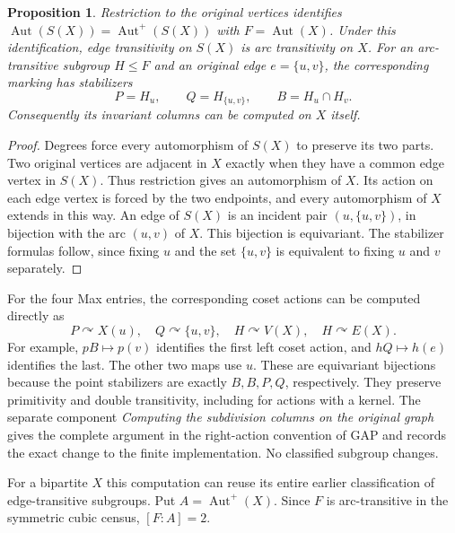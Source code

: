 \documentclass[11pt]{article}
\newtheorem{proposition}[theorem]{Proposition}
\theoremstyle{definition}\newtheorem{definition}[theorem]{Definition}
\newcommand{\Aut}{\operatorname{Aut}}
\begin{document}
\begin{proposition}\label{prop:subdivision}
Restriction to the original vertices identifies
$\Aut(S(X))=\Aut^+(S(X))$ with $F=\Aut(X)$.  Under this identification,
edge transitivity on $S(X)$ is arc transitivity on $X$.  For an
arc-transitive subgroup $H\le F$ and an original edge $e=\{u,v\}$,
the corresponding marking has stabilizers
\[
 P=H_u,\qquad Q=H_{\{u,v\}},\qquad B=H_u\cap H_v.
\]
Consequently its invariant columns can be computed on $X$ itself.
\end{proposition}
\begin{proof}
Degrees force every automorphism of $S(X)$ to preserve its two
parts.  Two original vertices are adjacent in $X$ exactly when they
have a common edge vertex in $S(X)$.  Thus restriction gives an
automorphism of $X$.  Its action on each edge vertex is forced by
the two endpoints, and every automorphism of $X$ extends in this
way.  An edge of $S(X)$ is an incident pair $(u,\{u,v\})$, in
bijection with the arc $(u,v)$ of $X$.  This bijection is equivariant.
The stabilizer formulas follow, since fixing $u$ and the set
$\{u,v\}$ is equivalent to fixing $u$ and $v$ separately.
\end{proof}

For the four Max entries, the corresponding coset actions can
be computed directly as
\[
 P\curvearrowright X(u),\quad
 Q\curvearrowright\{u,v\},\quad
 H\curvearrowright V(X),\quad H\curvearrowright E(X).
\]
For example, $pB\mapsto p(v)$ identifies the first left coset
action, and $hQ\mapsto h(e)$ identifies the last.  The other two
maps use $u$.  These are equivariant bijections because the point
stabilizers are exactly $B,B,P,Q$, respectively.  They preserve
primitivity and double transitivity, including for actions with a
kernel.  The separate component \emph{Computing the subdivision
columns on the original graph} gives the complete argument in
the right-action convention of GAP and records the exact change
to the finite implementation.  No classified subgroup changes.

For a bipartite $X$ this computation can reuse its entire earlier
classification of edge-transitive subgroups.  Put $A=\Aut^+(X)$.
Since $F$ is arc-transitive in the symmetric cubic census,
$[F:A]=2$.
\end{document}

